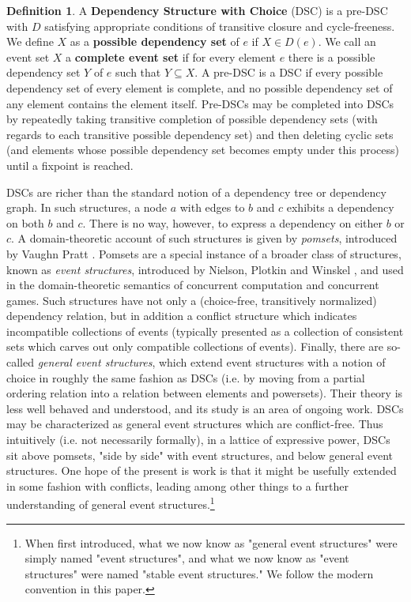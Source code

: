 \documentclass[hoptionsi,review,format=acmsmall]{acmart}
\theoremstyle{definition}
\newtheorem{definition}{Definition}[section]
\begin{document}
\begin{definition}
A \textbf{Dependency Structure with Choice} (DSC) is a pre-DSC with \(D\) satisfying  appropriate conditions of transitive closure and cycle-freeness. We define \(X\) as a \textbf{possible dependency set} of \(e\) if \(X \in D(e)\). We call an event set \(X\) a \textbf{complete event set} if for every element \(e\) there is a possible dependency set \(Y\) of \(e\) such that \(Y \subseteq X\). A pre-DSC is a DSC if every possible dependency set of every element is complete, and no possible dependency set of any element contains the element itself. Pre-DSCs may be completed into DSCs by repeatedly taking transitive completion of possible dependency sets (with regards to each transitive possible dependency set) and then deleting cyclic sets (and elements whose possible dependency set becomes empty under this process) until a fixpoint is reached.
\end{definition}

DSCs are richer than the standard notion of a dependency tree or dependency graph. In such structures, a node \(a\) with edges to \(b\) and \(c\) exhibits a dependency on both \(b\) and \(c\). There is no way, however, to express a dependency on either \(b\) or \(c\). A domain-theoretic account of such structures is given by \textit{pomsets}, introduced by Vaughn Pratt \cite{pratt1986modeling}. Pomsets are a special instance of a broader class of structures, known as \textit{event structures}, introduced by Nielson, Plotkin and Winskel \cite{nielsen1981petri}, and used in the domain-theoretic semantics of concurrent computation and concurrent games. Such structures have not only a (choice-free, transitively normalized) dependency relation, but in addition a conflict structure which indicates incompatible collections of events (typically presented as a collection of consistent sets which carves out only compatible collections of events). Finally, there are so-called \textit{general event structures}, which extend event structures with a notion of choice in roughly the same fashion as DSCs (i.e. by moving from a partial ordering relation into a relation between elements and powersets). Their theory is less well behaved and understood, and its study is an area of ongoing work. DSCs may be characterized as general event structures which are conflict-free. Thus intuitively (i.e. not necessarily formally), in a lattice of expressive power, DSCs sit above pomsets, "side by side" with event structures, and below general event structures. One hope of the present is work is that it might be usefully extended in some fashion with conflicts, leading among other things to a further understanding of general event structures.\footnote{When first introduced, what we now know as "general event structures" were simply named "event structures", and what we now know as "event structures" were named "stable event structures." We follow the modern convention in this paper.}
\end{document}
